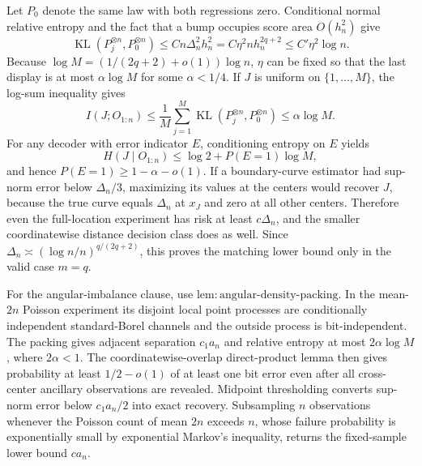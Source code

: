 Let \(P_0\) denote the same law with both regressions zero.  Conditional normal relative entropy and the fact that a bump occupies score area \(O(h_n^2)\) give
\[
 \operatorname{KL}(P_j^{\otimes n},P_0^{\otimes n})
 \leq Cn\Delta_n^2h_n^2
 =C\eta^2nh_n^{2q+2}
 \leq C'\eta^2\log n.
\]
Because \(\log M=(1/(2q+2)+o(1))\log n\), \(\eta\) can be fixed so that the last display is at most \(\alpha\log M\) for some \(\alpha<1/4\).  If \(J\) is uniform on \(\{1,\ldots,M\}\), the log-sum inequality gives
\[
 I(J;O_{1:n})
 \leq\frac1M\sum_{j=1}^M
 \operatorname{KL}(P_j^{\otimes n},P_0^{\otimes n})
 \leq\alpha\log M.
\]
For any decoder with error indicator \(E\), conditioning entropy on \(E\) yields
\[
 H(J\mid O_{1:n})\leq\log2+P(E=1)\log M,
\]
and hence \(P(E=1)\geq1-\alpha-o(1)\).  If a boundary-curve estimator had sup-norm error below \(\Delta_n/3\), maximizing its values at the centers would recover \(J\), because the true curve equals \(\Delta_n\) at \(x_J\) and zero at all other centers.  Therefore even the full-location experiment has risk at least \(c\Delta_n\), and the smaller coordinatewise distance decision class does as well.  Since \(\Delta_n\asymp(\log n/n)^{q/(2q+2)}\), this proves the matching lower bound only in the valid case \(m=q\).

For the angular-imbalance clause, use \(\mathrm{lem:angular\text{-}density\text{-}packing}\).  In the mean-\(2n\) Poisson experiment its disjoint local point processes are conditionally independent standard-Borel channels and the outside process is bit-independent.  The packing gives adjacent separation \(c_1a_n\) and relative entropy at most \(2\alpha\log M\), where \(2\alpha<1\).  The coordinatewise-overlap direct-product lemma then gives probability at least \(1/2-o(1)\) of at least one bit error even after all cross-center ancillary observations are revealed.  Midpoint thresholding converts sup-norm error below \(c_1a_n/2\) into exact recovery.  Subsampling \(n\) observations whenever the Poisson count of mean \(2n\) exceeds \(n\), whose failure probability is exponentially small by exponential Markov's inequality, returns the fixed-sample lower bound \(ca_n\).

